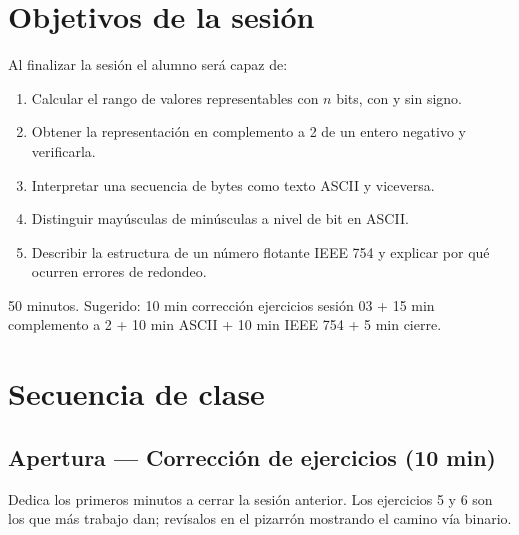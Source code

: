 \documentclass[12pt, oneside]{article}
\begin{document}

\tableofcontents
\newpage

\section{Objetivos de la sesión}

Al finalizar la sesión el alumno será capaz de:

\begin{enumerate}
  \item Calcular el rango de valores representables con $n$ bits, con y sin signo.
  \item Obtener la representación en complemento a 2 de un entero negativo
        y verificarla.
  \item Interpretar una secuencia de bytes como texto ASCII y viceversa.
  \item Distinguir mayúsculas de minúsculas a nivel de bit en ASCII.
  \item Describir la estructura de un número flotante IEEE 754 y explicar
        por qué ocurren errores de redondeo.
\end{enumerate}

\begin{notaprofesor}
  50 minutos. Sugerido: 10 min corrección ejercicios sesión 03 +
  15 min complemento a 2 + 10 min ASCII + 10 min IEEE 754 + 5 min cierre.
\end{notaprofesor}

\section{Secuencia de clase}

\subsection{Apertura — Corrección de ejercicios (10 min)}

Dedica los primeros minutos a cerrar la sesión anterior.
Los ejercicios 5 y 6 son los que más trabajo dan; revísalos en el pizarrón
mostrando el camino vía binario.
\end{document}
